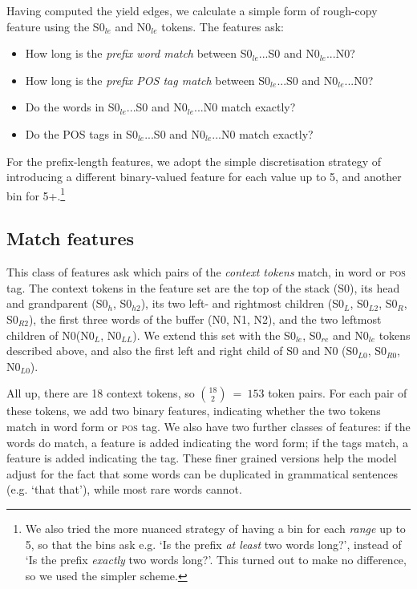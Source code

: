 \documentclass[11pt,letterpaper]{article}
\newcommand{\pos}{\textsc{pos}\xspace}
\newcommand{\szero}{S0\xspace}
\newcommand{\nzero}{N0\xspace}
\newcommand{\szeroH}{S0$_h$\xspace}
\newcommand{\szeroHH}{S0$_{h2}$\xspace}
\newcommand{\szeroL}{S0$_L$\xspace}
\newcommand{\szeroLL}{S0$_{L2}$\xspace}
\newcommand{\szeroR}{S0$_R$\xspace}
\newcommand{\szeroRR}{S0$_{R2}$\xspace}
\newcommand{\szeroLzero}{S0$_{L0}$\xspace}
\newcommand{\szeroRzero}{S0$_{R0}$\xspace}
\newcommand{\nzeroL}{N0$_L$\xspace}
\newcommand{\nzeroLL}{N0$_{LL}$\xspace}
\newcommand{\nzeroLzero}{N0$_{L0}$\xspace}
\newcommand{\szeroRedge}{S0$_{re}$\xspace}
\newcommand{\szeroLedge}{S0$_{le}$\xspace}
\newcommand{\nzeroLedge}{N0$_{le}$\xspace}
\begin{document}
Having computed the yield edges, we calculate a simple form of rough-copy feature using the \szeroLedge and \nzeroLedge tokens.  The features ask:

\begin{itemize}
    \item How long is the \emph{prefix word match} between \szeroLedge...\szero
          and \nzeroLedge...\nzero?
    \item How long is the \emph{prefix POS tag match} between \szeroLedge...\szero
          and \nzeroLedge...\nzero?
    \item Do the words in \szeroLedge...\szero and \nzeroLedge...\nzero match
          exactly?
    \item Do the POS tags in \szeroLedge...\szero and \nzeroLedge...\nzero match
          exactly?
\end{itemize}

For the prefix-length features, we adopt the simple discretisation strategy of
introducing a different binary-valued feature for each value up to 5, and another
bin for 5+.\footnote{We also tried the more nuanced strategy of having a bin for each
\emph{range} up to 5, so that the bins ask e.g. `Is the prefix \emph{at
least} two words long?', instead of `Is the prefix \emph{exactly} two words long?'.
This turned out to make no difference, so we used the simpler scheme.}

\subsection{Match features}

This class of features ask which pairs of the \emph{context tokens} match, in
word or \pos tag.  The context tokens in the \citet{zhang:11} feature set
are the top of the stack (\szero), its head and grandparent (\szeroH, \szeroHH),
its two left- and rightmost children (\szeroL, \szeroLL, \szeroR, \szeroRR), the
first three words of the buffer (\nzero, N1, N2), and the two leftmost children
of \nzero (\nzeroL, \nzeroLL).
We extend this set with the \szeroLedge, \szeroRedge and \nzeroLedge tokens
described above, and also the first left and right child of \szero and \nzero
(\szeroLzero, \szeroRzero, \nzeroLzero).

All up, there are 18 context tokens, so ${18 \choose 2}~=~153$ token pairs.
For each pair of these tokens, we add two binary features, indicating whether the
two tokens match in word form or \pos tag.  We also have two further classes of
features: if the words do match, a feature is added indicating the word form;
if the tags match, a feature is added indicating the tag. These finer grained
versions help the model adjust for the fact that some words can be duplicated
in grammatical sentences (e.g. `that that'), while most rare words cannot.
\end{document}
